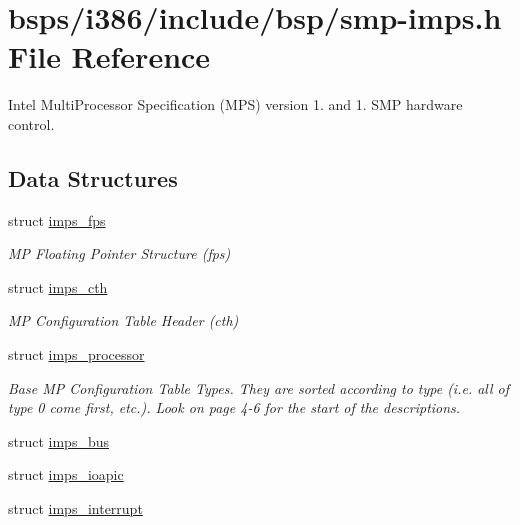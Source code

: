 \hypertarget{smp-imps_8h}{}\section{bsps/i386/include/bsp/smp-\/imps.h File Reference}
\label{smp-imps_8h}


Intel Multi\+Processor Specification (M\+PS) version 1. and 1. S\+MP hardware control.  


\subsection*{Data Structures}
\begin{DoxyCompactItemize}
\item 
struct \mbox{\hyperlink{structimps__fps}{imps\+\_\+fps}}
\begin{DoxyCompactList}\small\item\em MP Floating Pointer Structure (fps) \end{DoxyCompactList}\item 
struct \mbox{\hyperlink{structimps__cth}{imps\+\_\+cth}}
\begin{DoxyCompactList}\small\item\em MP Configuration Table Header (cth) \end{DoxyCompactList}\item 
struct \mbox{\hyperlink{structimps__processor}{imps\+\_\+processor}}
\begin{DoxyCompactList}\small\item\em Base MP Configuration Table Types. They are sorted according to type (i.\+e. all of type 0 come first, etc.). Look on page 4-\/6 for the start of the descriptions. \end{DoxyCompactList}\item 
struct \mbox{\hyperlink{structimps__bus}{imps\+\_\+bus}}
\item 
struct \mbox{\hyperlink{structimps__ioapic}{imps\+\_\+ioapic}}
\item 
struct \mbox{\hyperlink{structimps__interrupt}{imps\+\_\+interrupt}}
\end{DoxyCompactItemize}
